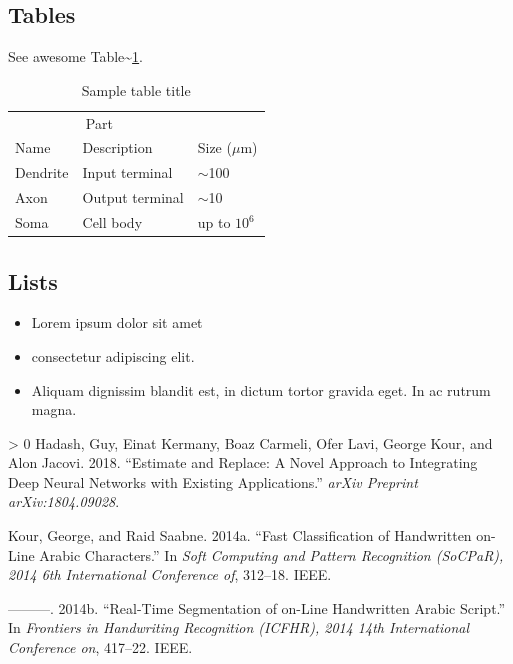 \documentclass{article}
\newlength{\cslhangindent}
\newenvironment{CSLReferences}[3] %
 {%
  \setlength{\parindent}{0pt}
  \ifodd #1 \everypar{\setlength{\hangindent}{\cslhangindent}}\ignorespaces\fi
  \ifnum #2 > 0
  \setlength{\parskip}{#2\baselineskip}
  \fi
 }%
 {}
\begin{document}
\hypertarget{tables}{%
\subsection{Tables}\label{tables}}

\lipsum[12]

See awesome Table\textasciitilde{}\ref{tab:table}.

\begin{table}
 \caption{Sample table title}
  \centering
  \begin{tabular}{lll}
    \toprule
    \multicolumn{2}{c}{Part}                   \\
    \cmidrule(r){1-2}
    Name     & Description     & Size ($\mu$m) \\
    \midrule
    Dendrite & Input terminal  & $\sim$100     \\
    Axon     & Output terminal & $\sim$10      \\
    Soma     & Cell body       & up to $10^6$  \\
    \bottomrule
  \end{tabular}
  \label{tab:table}
\end{table}

\hypertarget{lists}{%
\subsection{Lists}\label{lists}}

\begin{itemize}
\tightlist
\item
  Lorem ipsum dolor sit amet
\item
  consectetur adipiscing elit.
\item
  Aliquam dignissim blandit est, in dictum tortor gravida eget. In ac
  rutrum magna.
\end{itemize}

\hypertarget{refs}{}
\begin{CSLReferences}{1}{0}
\leavevmode\hypertarget{ref-hadash2018estimate}{}%
Hadash, Guy, Einat Kermany, Boaz Carmeli, Ofer Lavi, George Kour, and
Alon Jacovi. 2018. {``Estimate and Replace: A Novel Approach to
Integrating Deep Neural Networks with Existing Applications.''}
\emph{arXiv Preprint arXiv:1804.09028}.

\leavevmode\hypertarget{ref-kour2014fast}{}%
Kour, George, and Raid Saabne. 2014a. {``Fast Classification of
Handwritten on-Line Arabic Characters.''} In \emph{Soft Computing and
Pattern Recognition (SoCPaR), 2014 6th International Conference of},
312--18. IEEE.

\leavevmode\hypertarget{ref-kour2014real}{}%
---------. 2014b. {``Real-Time Segmentation of on-Line Handwritten
Arabic Script.''} In \emph{Frontiers in Handwriting Recognition (ICFHR),
2014 14th International Conference on}, 417--22. IEEE.

\end{CSLReferences}



\end{document}
